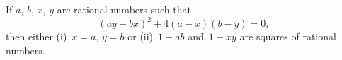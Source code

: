 If $a$, $b$, $x$, $y$ are rational numbers such that
\[
(ay - bx)^{2} + 4(a - x)(b - y) = 0,
\]
then either (i)~$x = a$, $y = b$ or (ii)~$1 - ab$ and~$1 - xy$ are squares of rational
numbers. 

